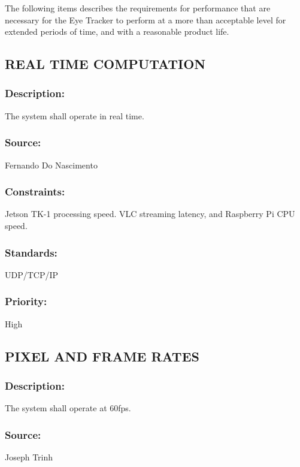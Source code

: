 The following items describes the requirements for performance that are necessary for the Eye Tracker to perform at a more than acceptable level for extended periods of time, and with a reasonable product life.

\subsection{\text REAL TIME COMPUTATION}
\subsubsection{Description:} 
	{The system shall operate in real time.}
\subsubsection{Source:} 
	{Fernando Do Nascimento}
\subsubsection{Constraints:} 
	{Jetson TK-1 processing speed. VLC streaming latency, and Raspberry Pi CPU speed.}
\subsubsection{Standards:} 
	{UDP/TCP/IP}
\subsubsection{Priority:} 
	{High}
\newline
\newline
	
\subsection{\text PIXEL AND FRAME RATES}
\subsubsection{Description:} 
	{The system shall operate at 60fps.}
\subsubsection{Source:} 
	{Joseph Trinh}
